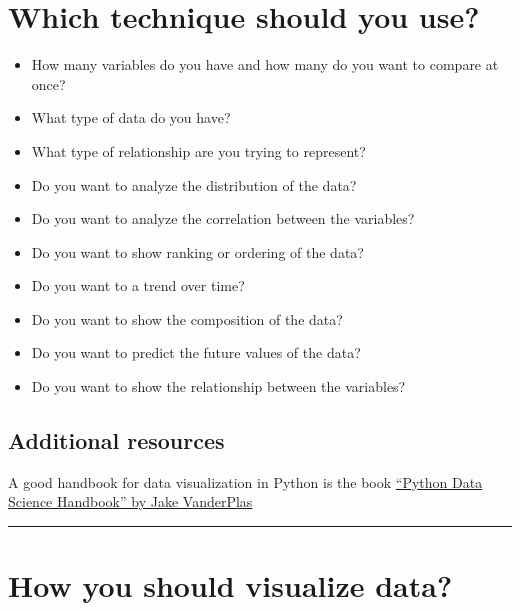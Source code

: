 \documentclass[
  letterpaper,
  DIV=11,
  numbers=noendperiod]{scrreprt}
\providecommand{\tightlist}{%
  \setlength{\itemsep}{0pt}\setlength{\parskip}{0pt}}\usepackage{longtable,booktabs,array}
\begin{document}
\section*{Which technique should you
use?}\label{which-technique-should-you-use}


\begin{itemize}
\tightlist
\item
  How many variables do you have and how many do you want to compare at
  once?
\item
  What type of data do you have?
\item
  What type of relationship are you trying to represent?
\item
  Do you want to analyze the distribution of the data?
\item
  Do you want to analyze the correlation between the variables?
\item
  Do you want to show ranking or ordering of the data?
\item
  Do you want to a trend over time?
\item
  Do you want to show the composition of the data?
\item
  Do you want to predict the future values of the data?
\item
  Do you want to show the relationship between the variables?
\end{itemize}

\subsection*{Additional resources}\label{additional-resources}

A good handbook for data visualization in Python is the book
\href{https://jakevdp.github.io/PythonDataScienceHandbook/04.00-introduction-to-matplotlib.html}{``Python
Data Science Handbook'' by Jake VanderPlas}

\begin{center}\rule{0.5\linewidth}{0.5pt}\end{center}

\section*{How you should visualize
data?}\label{how-you-should-visualize-data}
\end{document}
